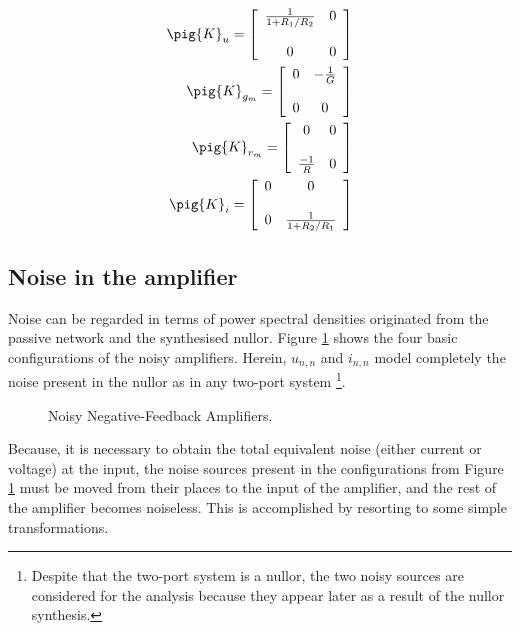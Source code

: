 \documentclass{ecctd01}
\begin{document}
\begin{eqnarray}
\pig{K}_{u}=
\left[\begin{array}{cc}
\frac{1}{1+R_1/R_2}&0\\\\
0&0
\end{array} \right]
\label{eq:mabcd1}
\\
\pig{K}_{g_m} =
\left[\begin{array}{cc}
0&-\frac{1}{G}\\\\
0&0
\end{array}\right]
\label{eq:mabcd2}
\\
\pig{K}_{r_m} =
\left[\begin{array}{cc}
0&0\\\\
\frac{-1}{R}&0
\end{array}\right]
\label{eq:mabcd3}
\\
\pig{K}_{i} =
\left[\begin{array}{cc}
0&0\\\\
0&\frac{1}{1+R_2/R_1}
\end{array}\right]
\label{eq:mabcd4}
\end{eqnarray}

\subsection{Noise in the amplifier}
Noise can be regarded in terms of power spectral densities originated
from the passive network and the synthesised nullor.
Figure \ref{figure3} shows the four basic configurations of the noisy
amplifiers.
Herein, $u_{n,n}$ and $i_{n,n}$ model completely the noise present in 
the nullor as in any
two-port system \cite{haus,bias1}\footnote{Despite that
the two-port system is a nullor, the two noisy sources are
considered for the analysis because they appear later as
a result of the nullor synthesis.}.

\begin{figure}[hbtp]
\centerline{
\epsfxsize=78mm
}
\caption{Noisy Negative-Feedback Amplifiers.}
\label{figure3}
\end{figure} 

Because, it is necessary to obtain the total equivalent noise 
(either current or voltage) at the input, the noise sources present in
the configurations from Figure \ref{figure3} must be moved from their
places to the input of the amplifier, and the rest of the amplifier
becomes noiseless. This is accomplished by resorting to
some simple transformations.
\end{document}
